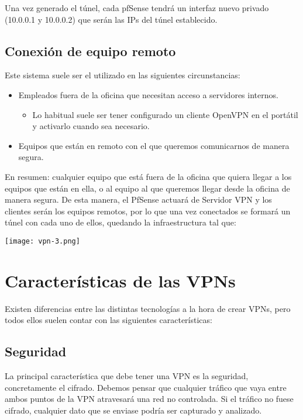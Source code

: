 Una vez generado el túnel, cada pfSense tendrá un interfaz nuevo privado (10.0.0.1 y 10.0.0.2) que serán las IPs del túnel establecido.


\subsection{Conexión de equipo remoto}
Este sistema suele ser el utilizado en las siguientes circunstancias:

\begin{itemize}
    \item Empleados fuera de la oficina que necesitan acceso a servidores internos.
    \begin{itemize}
        \item Lo habitual suele ser tener configurado un cliente OpenVPN en el portátil y activarlo cuando sea necesario.
    \end{itemize}
    \item Equipos que están en remoto con el que queremos comunicarnos de manera segura.
\end{itemize}

En resumen: cualquier equipo que está fuera de la oficina que quiera llegar a los equipos que están en ella, o al equipo al que queremos llegar desde la oficina de manera segura. De esta manera, el PfSense actuará de Servidor VPN y los clientes serán los equipos remotos, por lo que una vez conectados se formará un túnel con cada uno de ellos, quedando la infraestructura tal que:

\begin{center}
    \texttt{[image: vpn-3.png]}
\end{center}


\section{Características de las VPNs}
Existen diferencias entre las distintas tecnologías a la hora de crear VPNs, pero todos ellos suelen contar con las siguientes características:

\subsection{Seguridad}
La principal característica que debe tener una VPN es la seguridad, concretamente el cifrado. Debemos pensar que cualquier tráfico que vaya entre ambos puntos de la VPN atravesará una red no controlada. Si el tráfico no fuese cifrado, cualquier dato que se enviase podría ser capturado y analizado.

